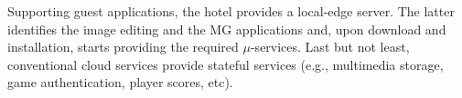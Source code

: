 Supporting guest applications, the hotel provides a local-edge server. The latter identifies the image editing and the MG applications and, upon download and installation, starts providing the required $\mu$-services. %
Last but not least, conventional cloud services provide stateful services (e.g., multimedia storage, game authentication, player scores, etc).%








